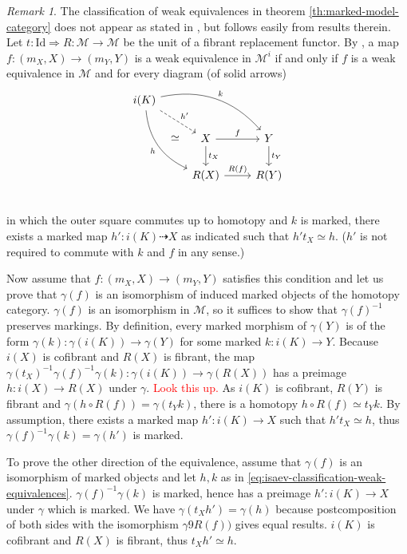 \documentclass{article}
\newcommand{\todo}[1]{\textcolor{red}{#1}}
\theoremstyle{remark}
\newtheorem{remark}{Remark}
\theoremstyle{definition}
\begin{document}
\begin{remark}
  The classification of weak equivalences in theorem \ref{th:marked-model-category} does not appear as stated in \cite{marked-objects}, but follows easily from results therein.
  Let $t : \mathrm{Id} \Rightarrow R : \mathcal{M} \rightarrow \mathcal{M}$ be the unit of a fibrant replacement functor.
  By \cite[lemma 2.5]{marked-objects}, a map $f : (m_X, X) \rightarrow (m_Y, Y)$ is a weak equivalence in $\mathcal{M}^i$ if and only if $f$ is a weak equivalence in $\mathcal{M}$ and for every diagram (of solid arrows)
  \begin{equation}
    \label{eq:isaev-classification-weak-equivalences}
    \begin{tikzcd}
      i(K) \arrow[drr, bend left, "k"] \arrow[ddr, bend right, "h"'] \arrow[dr, dashed, "h'"] \arrow[ddr, phantom, "\simeq"] \\
      & X \arrow[d, "t_X"] \arrow[r, "f"] & Y \arrow[d, "t_Y"]  \\
      & R(X) \arrow[r, "R(f)"] & R(Y)  \\
    \end{tikzcd}
  \end{equation}
  in which the outer square commutes up to homotopy and $k$ is marked, there exists a marked map $h' : i(K) \dashrightarrow X$ as indicated such that $h' t_X \simeq h$.
  ($h'$ is not required to commute with $k$ and $f$ in any sense.)

  Now assume that $f : (m_X, X) \rightarrow (m_Y, Y)$ satisfies this condition and let us prove that $\gamma(f)$ is an isomorphism of induced marked objects of the homotopy category.
  $\gamma(f)$ is an isomorphism in $\mathcal{M}$, so it suffices to show that $\gamma(f)^{-1}$ preserves markings.
  By definition, every marked morphism of $\gamma(Y)$ is of the form $\gamma(k) : \gamma(i(K)) \rightarrow \gamma(Y)$ for some marked $k : i(K) \rightarrow Y$.
  Because $i(X)$ is cofibrant and $R(X)$ is fibrant, the map $\gamma(t_X)^{-1} \gamma(f)^{-1} \gamma(k) : \gamma(i(K)) \rightarrow \gamma(R(X))$ has a preimage $h : i(X) \rightarrow R(X)$ under $\gamma$.
  \todo{Look this up.}
  As $i(K)$ is cofibrant, $R(Y)$ is fibrant and $\gamma(h \circ R(f)) = \gamma(t_Y k)$, there is a homotopy $h \circ R(f) \simeq t_Y k$.
  By assumption, there exists a marked map $h' : i(K) \rightarrow X$ such that $h' t_X \simeq h$, thus $\gamma(f)^{-1} \gamma(k) = \gamma(h')$ is marked.

  To prove the other direction of the equivalence, assume that $\gamma(f)$ is an isomorphism of marked objects and let $h, k$ as in \eqref{eq:isaev-classification-weak-equivalences}.
  $\gamma(f)^{-1} \gamma(k)$ is marked, hence has a preimage $h' : i(K) \rightarrow X$ under $\gamma$ which is marked.
  We have $\gamma(t_X h') = \gamma(h)$ because postcomposition of both sides with the isomorphism $\gamma9R(f))$ gives equal results.
  $i(K)$ is cofibrant and $R(X)$ is fibrant, thus $t_X h' \simeq h$.
\end{remark}
\end{document}
